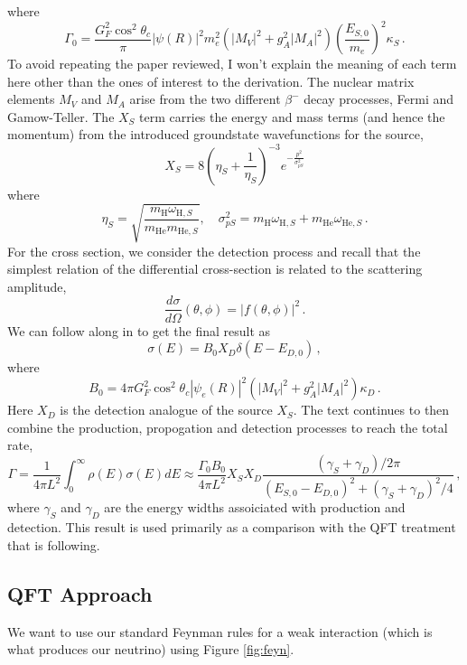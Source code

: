 \documentclass[10pt]{article}
\begin{document}
where
\begin{equation}
  \Gamma_{0} = \frac{G^{2}_{F}\cos^{2}\theta_{c}}{\pi}|\psi(R)|^{2}m_{e}^{2}(|M_{V}|^{2}+g^{2}_{A}|M_{A}|^{2})\left(\frac{E_{S,0}}{m_{e}}\right)^{2}\kappa_{S}\, .
\end{equation}
To avoid repeating the paper reviewed, I won't explain the meaning of each term here other than the ones of interest to the derivation. The nuclear matrix elements $M_{V}$ and $M_{A}$ arise from the two different $\beta^{-}$ decay processes, Fermi and Gamow-Teller. The $X_{S}$ term carries the energy and mass terms (and hence the momentum) from the introduced groundstate wavefunctions for the source,
\begin{equation}
  X_{S} = 8\left(\eta_{S} + \frac{1}{\eta_{S}}\right)^{-3}e^{-\frac{p^{2}}{\sigma_{pS}^{2}}}
\end{equation}
where
\begin{equation}
  \eta_{S} = \sqrt{\frac{m_{\text{H}}\omega_{\text{H},S}}{m_{\text{He}}m_{\text{He},S}}}, \quad \sigma^{2}_{pS} = m_{\text{H}}\omega_{\text{H},S} + m_{\text{He}}\omega_{\text{He},S}\, .
\end{equation}
For the cross section, we consider the detection process and recall that the simplest relation of the differential cross-section is related to the scattering amplitude,
\begin{equation}
  \frac{d\sigma}{d\Omega}(\theta, \phi) = |f(\theta,\phi)|^{2}\, .
\end{equation}
We can follow along in \cite{bahcall, mik} to get the final result as
\begin{equation}
  \sigma(E) = B_{0}X_{D}\delta(E - E_{D,0})\, ,
\end{equation}
where
\begin{equation}
  B_{0} = 4\pi G_{F}^{2}\cos^{2}\theta_{c}|\psi_{e}(R)|^{2}(|M_{V}|^{2} + g_{A}^{2}|M_{A}|^{2})\kappa_{D}\, .
\end{equation}
Here $X_{D}$ is the detection analogue of the source $X_{S}$. The text continues to then combine the production, propogation and detection processes to reach the total rate,
\begin{equation}
  \Gamma = \frac{1}{4\pi L^{2}}\int_{0}^{\infty}\rho(E)\sigma(E)dE \approx \frac{\Gamma_{0}B_{0}}{4\pi L^{2}}X_{S}X_{D}\frac{(\gamma_{S} + \gamma_{D})/2\pi}{(E_{S,0} - E_{D,0})^{2} + (\gamma_{S} + \gamma_{D})^{2}/4}\, ,
\end{equation}
where $\gamma_{S}$ and $\gamma_{D}$ are the energy widths assoiciated with production and detection. This result is used primarily as a comparison with the QFT treatment that is following.

\subsection{QFT Approach}
We want to use our standard Feynman rules for a weak interaction (which is what produces our neutrino) using Figure \ref{fig:feyn}. 
\end{document}
